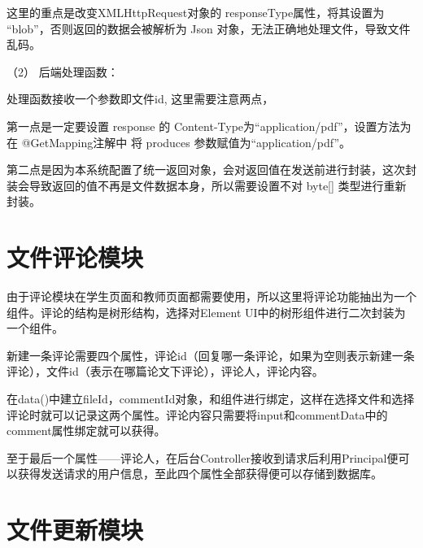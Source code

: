这里的重点是改变XMLHttpRequest对象的 responseType属性，将其设置为 “blob”，否则返回的数据会被解析为 Json 对象，无法正确地处理文件，导致文件乱码。

（2） 后端处理函数：

处理函数接收一个参数即文件id, 这里需要注意两点，

第一点是一定要设置 response 的 Content-Type为“application/pdf”，设置方法为在 @GetMapping注解中 将 produces 参数赋值为“application/pdf”。

第二点是因为本系统配置了统一返回对象，会对返回值在发送前进行封装，这次封装会导致返回的值不再是文件数据本身，所以需要设置不对 byte[] 类型进行重新封装。

\section{文件评论模块}

由于评论模块在学生页面和教师页面都需要使用，所以这里将评论功能抽出为一个组件。评论的结构是树形结构，选择对Element UI中的树形组件进行二次封装为一个组件。

新建一条评论需要四个属性，评论id（回复哪一条评论，如果为空则表示新建一条评论），文件id（表示在哪篇论文下评论），评论人，评论内容。

在data()中建立fileId，commentId对象，和组件进行绑定，这样在选择文件和选择评论时就可以记录这两个属性。评论内容只需要将input和commentData中的comment属性绑定就可以获得。

至于最后一个属性——评论人，在后台Controller接收到请求后利用Principal便可以获得发送请求的用户信息，至此四个属性全部获得便可以存储到数据库。

\section{文件更新模块}

